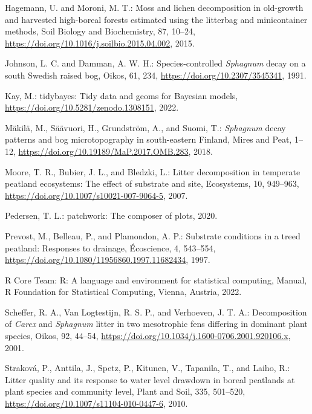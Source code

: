 \documentclass[
  12pt,
]{article}
\newlength{\cslhangindent}
\newlength{\cslentryspacingunit} %
\newenvironment{CSLReferences}[2] %
 {%
  \setlength{\parindent}{0pt}
  \ifodd #1
  \let\oldpar\par
  \def\par{\hangindent=\cslhangindent\oldpar}
  \fi
  \setlength{\parskip}{#2\cslentryspacingunit}
 }%
 {}
\begin{document}
\begin{CSLReferences}{0}{0}
\leavevmode{}%
Hagemann, U. and Moroni, M. T.: Moss and lichen decomposition in old-growth and harvested high-boreal forests estimated using the litterbag and minicontainer methods, Soil Biology and Biochemistry, 87, 10--24, \url{https://doi.org/10.1016/j.soilbio.2015.04.002}, 2015.

\leavevmode{}%
Johnson, L. C. and Damman, A. W. H.: Species-controlled {\emph{Sphagnum}} decay on a south {Swedish} raised bog, Oikos, 61, 234, \url{https://doi.org/10.2307/3545341}, 1991.

\leavevmode{}%
Kay, M.: {tidybayes}: {Tidy} data and geoms for {Bayesian} models, \url{https://doi.org/10.5281/zenodo.1308151}, 2022.

\leavevmode{}%
Mäkilä, M., Säävuori, H., Grundström, A., and Suomi, T.: {\emph{Sphagnum}} decay patterns and bog microtopography in south-eastern {Finland}, Mires and Peat, 1--12, \url{https://doi.org/10.19189/MaP.2017.OMB.283}, 2018.

\leavevmode{}%
Moore, T. R., Bubier, J. L., and Bledzki, L.: Litter decomposition in temperate peatland ecosystems: {The} effect of substrate and site, Ecosystems, 10, 949--963, \url{https://doi.org/10.1007/s10021-007-9064-5}, 2007.

\leavevmode{}%
Pedersen, T. L.: {patchwork}: {The} composer of plots, 2020.

\leavevmode{}%
Prevost, M., Belleau, P., and Plamondon, A. P.: Substrate conditions in a treed peatland: {Responses} to drainage, {É}coscience, 4, 543--554, \url{https://doi.org/10.1080/11956860.1997.11682434}, 1997.

\leavevmode{}%
R Core Team: R: {A} language and environment for statistical computing, Manual, R Foundation for Statistical Computing, Vienna, Austria, 2022.

\leavevmode{}%
Scheffer, R. A., Van Logtestijn, R. S. P., and Verhoeven, J. T. A.: Decomposition of {\emph{Carex}} and {\emph{Sphagnum}} litter in two mesotrophic fens differing in dominant plant species, Oikos, 92, 44--54, \url{https://doi.org/10.1034/j.1600-0706.2001.920106.x}, 2001.

\leavevmode{}%
Straková, P., Anttila, J., Spetz, P., Kitunen, V., Tapanila, T., and Laiho, R.: Litter quality and its response to water level drawdown in boreal peatlands at plant species and community level, Plant and Soil, 335, 501--520, \url{https://doi.org/10.1007/s11104-010-0447-6}, 2010.


\end{CSLReferences}
\end{document}
